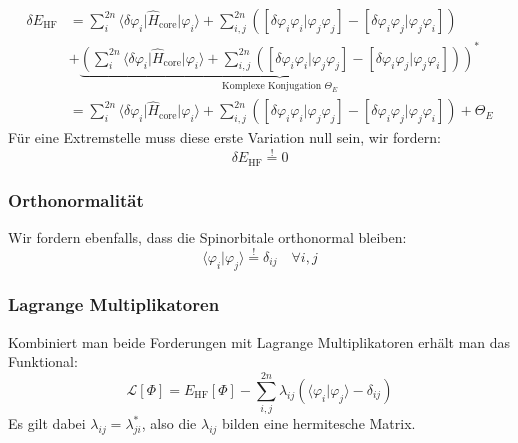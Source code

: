 \begin{equation}\label{E_HF}
  \begin{split}
  \delta E_\textrm{HF} &=
  \sum_i^{2n} \langle \delta \varphi_i \vert \hat{H}_{\text{core}} \vert \varphi_i \rangle
  + \sum_{i, j}^{2n} \left( 
    \left[ \delta \varphi_i \varphi_i \vert \varphi_j \varphi_j \right]
  - \left[ \delta \varphi_i \varphi_j \vert \varphi_j \varphi_i \right]
  \right)\\
  &+ \underbrace{\left( \sum_i^{2n} \langle \delta \varphi_i \vert \hat{H}_{\text{core}} \vert \varphi_i \rangle
  + \sum_{i, j}^{2n} \left( 
    \left[ \delta \varphi_i \varphi_i \vert \varphi_j \varphi_j \right]
  - \left[ \delta \varphi_i \varphi_j \vert \varphi_j \varphi_i \right]
  \right)\right)^*}_\textrm{Komplexe Konjugation $\Theta_E$}\\
  &= 
  \sum_i^{2n} \langle \delta \varphi_i \vert \hat{H}_{\text{core}} \vert \varphi_i \rangle
  + \sum_{i, j}^{2n} \left( 
    \left[ \delta \varphi_i \varphi_i \vert \varphi_j \varphi_j \right]
  - \left[ \delta \varphi_i \varphi_j \vert \varphi_j \varphi_i \right]
  \right) + \Theta_E
  \end{split}
\end{equation}
Für eine Extremstelle muss diese erste Variation null sein, wir fordern:
\begin{equation}
  \delta E_\textrm{HF} \overset{!}{=} 0
\end{equation}

\subsubsection*{Orthonormalität}
Wir fordern ebenfalls, dass die Spinorbitale orthonormal bleiben:
\begin{equation}
  \langle \varphi_i \vert \varphi_j \rangle \overset{!}{=} \delta_{ij}\quad \forall i,j
\end{equation}

\subsubsection*{Lagrange Multiplikatoren}
Kombiniert man beide Forderungen mit Lagrange Multiplikatoren erhält man das Funktional:
\begin{equation}
  \mathcal{L}[\Phi] = E_\textrm{HF}[\Phi]
  - \sum_{i,j}^{2n} \lambda_{ij}(\langle \varphi_i \vert \varphi_j \rangle - \delta_{ij})
\end{equation}
Es gilt dabei $\lambda_{ij} = \lambda_{ji}^*$,
also die $\lambda_{ij}$ bilden eine hermitesche Matrix. \cite[3.40]{szabo_ostlund_1996}

